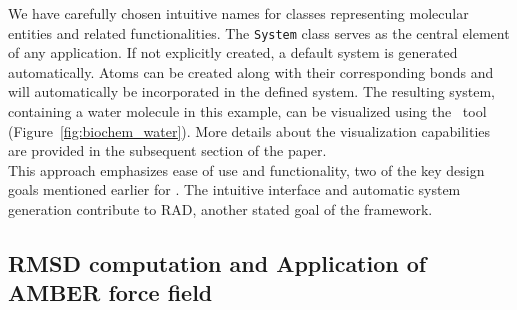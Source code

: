 We have carefully chosen intuitive names for classes representing molecular entities and related functionalities. The \texttt{System} class serves as the central element of any application. If not explicitly created, a default system is generated automatically. Atoms can be created along with their corresponding bonds and will automatically be incorporated in the defined system. The resulting system, containing a water molecule in this example, can be visualized using the \bioviz\ tool (Figure~\ref{fig:biochem_water}). More details about the visualization capabilities are provided in the subsequent section of the paper. \\
This approach emphasizes ease of use and functionality, two of the key design goals mentioned earlier for \biochem. The intuitive interface and automatic system generation contribute to RAD, another stated goal of the framework.



\subsection{RMSD computation and Application of AMBER force field}

